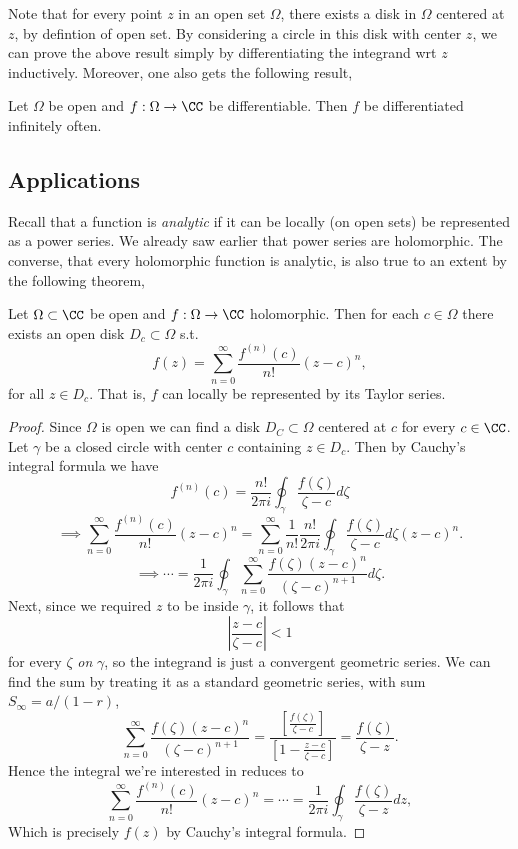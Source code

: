 Note that for every point $z$ in an open set $\Omega$, there exists a disk in
$\Omega$ centered at $z$, by defintion of open set. By considering a circle in
this disk with center $z$, we can prove the above result simply by
differentiating the integrand wrt $z$ inductively. Moreover, one also gets the
following result,
\begin{theorem}
  Let $\Omega$ be open and $f:\Omega\to\CC$ be differentiable. Then $f$ be
  differentiated infinitely often.
  \label{thm:complexDiffInfinity}
\end{theorem}

\subsection{Applications}
Recall that a function is \emph{analytic} if it can be locally (on open sets) be
represented as a power series. We already saw earlier that power series are
holomorphic. The converse, that every holomorphic function is analytic, is also
true to an extent by the following theorem,
\begin{theorem}
  Let $\Omega\subset\CC$ be open and $f:\Omega\to\CC$ holomorphic. Then for each
  $c\in\Omega$ there exists an open disk $D_c\subset\Omega$ s.t. 
  \[f(z)=\sum_{n=0}^{\infty} \frac{f^{(n)}(c)}{n!}(z-c)^n,\]
  for all $z\in D_c$. That is, $f$ can locally be represented by its Taylor
  series.
  \label{thm:analyticHolomorphic}
\end{theorem}
\begin{proof}
  Since $\Omega$ is open we can find a disk $D_C\subset\Omega$ centered at $c$
  for every $c\in\CC$. Let $\gamma$ be a closed circle with center $c$
  containing $z\in D_c$. Then by Cauchy's integral formula we have
  \[f^{(n)}(c) = \frac{n!}{2\pi i} \oint_{\gamma} \frac{f(\zeta)}{\zeta-c}
  d\zeta\]
  \[\implies \sum_{n=0}^{\infty} \frac{f^{(n)}(c)}{n!}(z-c)^n=
  \sum_{n=0}^{\infty} \frac{1}{n!} \frac{n!}{2\pi i} \oint_{\gamma}
  \frac{f(\zeta)}{\zeta-c} d\zeta  (z-c)^n.\] 
  \[\implies \cdots = \frac{1}{2\pi i} \oint_{\gamma} \sum_{n=0}^{\infty}
  \frac{f(\zeta) (z-c)^n}{(\zeta-c)^{n+1}}d\zeta.\]
  Next, since we required $z$ to be inside $\gamma$, it follows that 
  \[\left| \frac{z-c}{\zeta -c }\right| < 1\]
  for every $\zeta$ \emph{on} $\gamma$, so the integrand is just a convergent
  geometric series. We can find the sum by treating it as a standard geometric
  series, with sum $S_{\infty} =  a/(1-r)$, 
  \[\sum_{n=0}^{\infty} \frac{f(\zeta) (z-c)^n}{(\zeta-c)^{n+1}} =
  \frac{\left[ \frac{f(\zeta)}{\zeta-c}\right]}{\left[ 1-\frac{z-c}{\zeta-c}
  \right]} = \frac{f(\zeta) }{\zeta-z}. \]
  Hence the integral we're interested in reduces to 
  \[\sum_{n=0}^{\infty} \frac{f^{(n)}(c)}{n!}(z-c)^n = \cdots = \frac{1}{2\pi i}
  \oint_{\gamma} \frac{f(\zeta)}{\zeta-z}dz, \]
  Which is precisely $f(z)$ by Cauchy's integral formula.

\end{proof}
